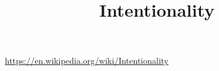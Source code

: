 \documentclass[a4paper]{article}
\title{Intentionality}
\date{}
\begin{document}
    \maketitle
    \url{https://en.wikipedia.org/wiki/Intentionality}
\end{document}
